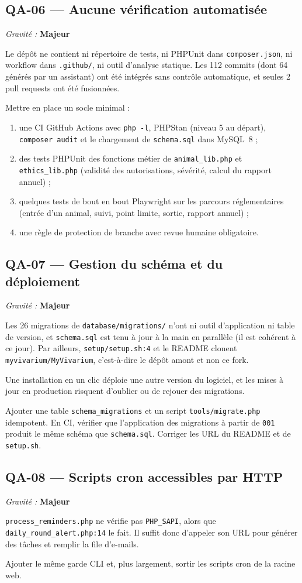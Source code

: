 \documentclass[11pt,a4paper]{article}
\newcommand{\maj}{\textcolor{maj}{\textbf{Majeur}}}
\newcommand{\f}[1]{\nolinkurl{#1}}
\newenvironment{constat}[3]{%
  \subsection*{#1 --- #2}\noindent\textit{Gravité :} #3\par\smallskip
  \begin{description}[leftmargin=2.6cm,style=nextline,itemsep=2pt]}{\end{description}}
\begin{document}
\begin{constat}{QA-06}{Aucune vérification automatisée}{\maj}
\item[Preuve] Le dépôt ne contient ni répertoire de tests, ni PHPUnit dans
  \f{composer.json}, ni workflow dans \f{.github/}, ni outil d'analyse statique.
  Les 112 commits (dont 64 générés par un assistant) ont été intégrés sans
  contrôle automatique, et seules 2 pull requests ont été fusionnées.
\item[Action] Mettre en place un socle minimal :
  \begin{enumerate}[nosep]
    \item une CI GitHub Actions avec \texttt{php -l}, PHPStan (niveau 5 au départ),
      \texttt{composer audit} et le chargement de \f{schema.sql} dans MySQL~8 ;
    \item des tests PHPUnit des fonctions métier de \f{animal_lib.php} et
      \f{ethics_lib.php} (validité des autorisations, sévérité, calcul du
      rapport annuel) ;
    \item quelques tests de bout en bout Playwright sur les parcours réglementaires
      (entrée d'un animal, suivi, point limite, sortie, rapport annuel) ;
    \item une règle de protection de branche avec revue humaine obligatoire.
  \end{enumerate}
\end{constat}

\begin{constat}{QA-07}{Gestion du schéma et du déploiement}{\maj}
\item[Preuve] Les 26 migrations de \f{database/migrations/} n'ont ni outil
  d'application ni table de version, et \f{schema.sql} est tenu à jour à la main
  en parallèle (il est cohérent à ce jour). Par ailleurs, \f{setup/setup.sh:4}
  et le README clonent \f{myvivarium/MyVivarium}, c'est-à-dire le dépôt amont et
  non ce fork.
\item[Risque] Une installation \og en un clic\fg{} déploie une autre version du
  logiciel, et les mises à jour en production risquent d'oublier ou de rejouer
  des migrations.
\item[Action] Ajouter une table \f{schema_migrations} et un script
  \f{tools/migrate.php} idempotent. En CI, vérifier que l'application des
  migrations à partir de \f{001} produit le même schéma que \f{schema.sql}.
  Corriger les URL du README et de \f{setup.sh}.
\end{constat}

\begin{constat}{QA-08}{Scripts cron accessibles par HTTP}{\maj}
\item[Preuve] \f{process_reminders.php} ne vérifie pas \f{PHP_SAPI}, alors que
  \f{daily_round_alert.php:14} le fait. Il suffit donc d'appeler son URL pour
  générer des tâches et remplir la file d'e-mails.
\item[Action] Ajouter le même garde CLI et, plus largement, sortir les scripts
  cron de la racine web.
\end{constat}
\end{document}
